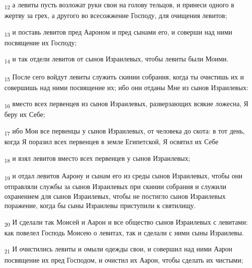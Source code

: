 \begin{tcolorbox}
\textsubscript{12} а левиты пусть возложат руки свои на голову тельцов, и принеси одного в жертву за грех, а другого во всесожжение Господу, для очищения левитов;
\end{tcolorbox}
\begin{tcolorbox}
\textsubscript{13} и поставь левитов пред Аароном и пред сынами его, и соверши над ними посвящение их Господу;
\end{tcolorbox}
\begin{tcolorbox}
\textsubscript{14} и так отдели левитов от сынов Израилевых, чтобы левиты были Моими.
\end{tcolorbox}
\begin{tcolorbox}
\textsubscript{15} После сего войдут левиты служить скинии собрания, когда ты очистишь их и совершишь над ними посвящение их; ибо они отданы Мне из сынов Израилевых:
\end{tcolorbox}
\begin{tcolorbox}
\textsubscript{16} вместо всех первенцев из сынов Израилевых, разверзающих всякие ложесна, Я беру их Себе;
\end{tcolorbox}
\begin{tcolorbox}
\textsubscript{17} ибо Мои все первенцы у сынов Израилевых, от человека до скота: в тот день, когда Я поразил всех первенцев в земле Египетской, Я освятил их Себе
\end{tcolorbox}
\begin{tcolorbox}
\textsubscript{18} и взял левитов вместо всех первенцев у сынов Израилевых;
\end{tcolorbox}
\begin{tcolorbox}
\textsubscript{19} и отдал левитов Аарону и сынам его из среды сынов Израилевых, чтобы они отправляли службы за сынов Израилевых при скинии собрания и служили охранением для сынов Израилевых, чтобы не постигло сынов Израилевых поражение, когда бы сыны Израилевы приступили к святилищу.
\end{tcolorbox}
\begin{tcolorbox}
\textsubscript{20} И сделали так Моисей и Аарон и все общество сынов Израилевых с левитами: как повелел Господь Моисею о левитах, так и сделали с ними сыны Израилевы.
\end{tcolorbox}
\begin{tcolorbox}
\textsubscript{21} И очистились левиты и омыли одежды свои, и совершил над ними Аарон посвящение их пред Господом, и очистил их Аарон, чтобы сделать их чистыми;
\end{tcolorbox}
